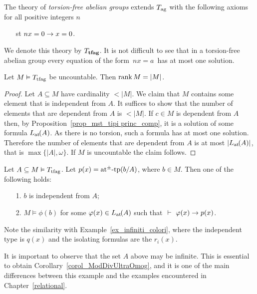 \documentclass[creche.tex]{subfiles}
\begin{document}
The theory of \emph{torsion-free abelian groups\/} extends $T_{\rm ag}$ with the following axioms for all positive integers $n$
\begin{itemize}
\item[st] $nx= 0\imp x=0$.
\end{itemize}
We denote this theory by \emph{$T_{\rm\bf tfag}$}. It is not difficult to see that in a torsion-free abelian group every equation of the form $\,nx = a\,$ has at most one solution.


\begin{proposition}
Let $M\models T_{\rm tfag}$ be uncountable. Then $\rank M=|M|$. 
\end{proposition}

\begin{proof}
Let $A\subseteq M$ have cardinality $<|M|$. We claim that $M$ contains some element that is independent from $A$. It suffices to show that the number of elements that are dependent from $A$ is $<|M|$. If $c\in M$ is dependent from $A$ then, by Proposition~\ref{prop_mst_tipi princ_comp}, it is a solution of some formula $\atL(A)$. As there is no torsion, such a formula has at most one solution. Therefore the number of elements that are dependent from $A$ is at most $|\atL(A)|$, that is $\max\big\{|A|,\omega\big\}$. If $M$ is uncountable the claim follows.
\end{proof}

\begin{proposition}\label{prop_mst_tipi princ_comp}
Let $A\subseteq M\models T_{\rm tfag}$.  Let $p(x)=\atpmtp(b/A)$, where $b \in M$. Then one of the following holds:   
\begin{itemize}
\item[1.] $b$ is independent from $A$;
\item[2.] $M\models\phi(b)$ for some $\phi(x)\in\atL(A)$ such that $\ \proves\ \phi(x)\imp p(x)$.
\end{itemize}\end{proposition}

Note the similarity with Example~\ref{ex_infiniti_colori}, where the independent type is $q(x)$ and the isolating formulas are the $r_i(x)$. 

It is important to observe that the set $A$ above may be infinite. This is essential to obtain Corollary~\ref{corol_ModDivUltraOmog}, and it is one of the main differences between this example and the examples encountered in Chapter~\ref{relational}. %
\end{document}
